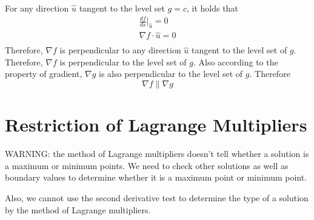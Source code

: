 \documentclass{article}
\begin{document}
For any direction $\hat{u}$ tangent to the level set $g = c$, it holds that
\begin{gather*}
  \frac{df}{ds}|_{\hat{u}} = 0 \\
  \nabla f \cdot \hat{u} = 0 \\
\end{gather*}
Therefore, $\nabla f$ is perpendicular to any direction $\hat{u}$ tangent to the 
level set of $g$. Therefore, $\nabla f$ is perpendicular to the level set of 
$g$. Also according to the property of gradient, $\nabla g$ is also 
perpendicular to the level set of $g$. Therefore 
\[ \nabla f \parallel \nabla g \]

\section{Restriction of Lagrange Multipliers}

WARNING: the method of Lagrange multipliers doesn't tell whether a solution is a 
maximum or minimum points. We need to check other solutions as well as boundary 
values to determine whether it is a maximum point or minimum point.

Also, we cannot use the second derivative test to determine the type of a 
solution by the method of Lagrange multipliers.
\end{document}
